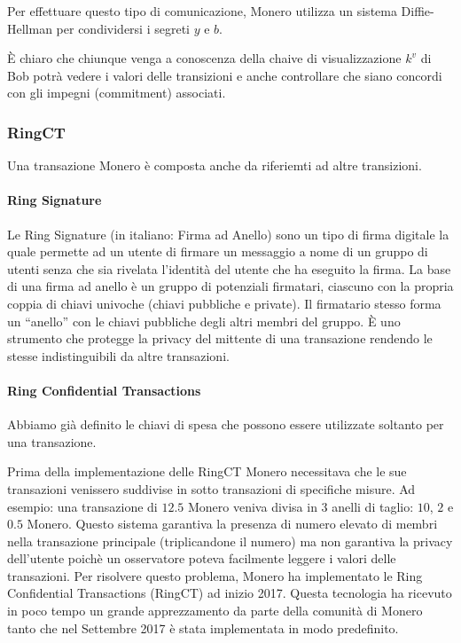 \documentclass[12pt,a4paper]{article}
\begin{document}
Per effettuare questo tipo di comunicazione, Monero utilizza un sistema Diffie-Hellman per condividersi i segreti $ y $ e $ b $.

È chiaro che chiunque venga a conoscenza della chaive di visualizzazione $ k^v $ di Bob potrà vedere i valori delle transizioni e anche controllare che siano concordi con gli impegni (commitment) associati.

\subsubsection*{RingCT}

Una transazione Monero è composta anche da riferiemti ad altre transizioni. 

\paragraph{Ring Signature}
Le Ring Signature (in italiano: Firma ad Anello) sono un tipo di firma digitale la quale permette ad un utente di firmare un messaggio a nome di un gruppo di utenti senza che sia rivelata l'identità del utente che ha eseguito la firma.
La base di una firma ad anello è un gruppo di potenziali firmatari, ciascuno con la propria coppia di chiavi univoche (chiavi pubbliche e private). Il firmatario stesso forma un “anello” con le chiavi pubbliche degli altri membri del gruppo. È uno strumento che protegge la privacy del mittente di una transazione rendendo le stesse indistinguibili da altre transazioni.

\paragraph{Ring Confidential Transactions}
Abbiamo già definito le chiavi di spesa che possono essere utilizzate soltanto per una transazione.

Prima della implementazione delle RingCT Monero necessitava che le sue transazioni venissero suddivise in sotto transazioni di specifiche misure. 
Ad esempio: una transazione di $ 12.5 $ Monero veniva divisa in 3 anelli di taglio: $ 10 $, $ 2 $ e $ 0.5 $ Monero. Questo sistema garantiva la presenza di numero elevato di membri nella transazione principale (triplicandone il numero) ma non garantiva la privacy dell'utente poichè un osservatore poteva facilmente leggere i valori delle transazioni. Per risolvere questo problema, Monero ha implementato le Ring Confidential Transactions (RingCT) ad inizio 2017. Questa tecnologia ha ricevuto in poco tempo un grande apprezzamento da parte della comunità di Monero tanto che nel Settembre 2017 è stata implementata in modo predefinito.
\end{document}
